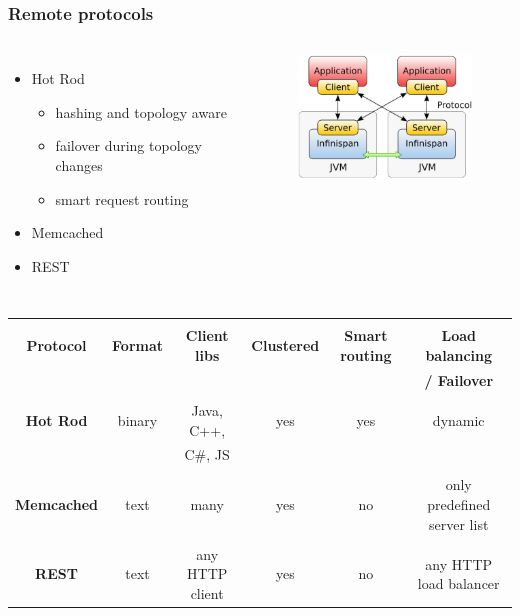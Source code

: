 \documentclass[10pt,utf8]{beamer}
\begin{document}
\begin{frame}
	\frametitle{Remote protocols}
	\begin{columns}
		\begin{itemize}
			\item Hot Rod
				\begin{itemize}
					\item hashing and topology aware
					\item failover during topology changes
					\item smart request routing
				\end{itemize}
			\item Memcached
			\item REST
		\end{itemize}
		\begin{figure}
			\includegraphics[width=5cm]{./img/ispn-cs.eps}
		\end{figure}
	\end{columns}
	
	 {
	\scriptsize{
	\begin{table}
		\begin{tabular}{|c||c|c|c|c|c|}
		\hline
			& & & & & \\
			\textbf{Protocol} & \textbf{Format} & \textbf{Client libs} & \textbf{Clustered} & \textbf{Smart routing} & \textbf{Load balancing} \\
			& & & & & \textbf{/ Failover} \\
		 \hline
			& & & & & \\
		 \textbf{Hot Rod} & binary & Java, C++,  & yes & yes & dynamic \\
		 & & C\#, JS & & & \\
			& & & & & \\
		 \textbf{Memcached} & text & many & yes & no & only predefined server list \\
			& & & & & \\
		 \textbf{REST} & text & any HTTP client & yes & no & any HTTP load balancer \\
		 \hline
		\end{tabular}
	\end{table}
	}
	}
\end{frame}
\end{document}
